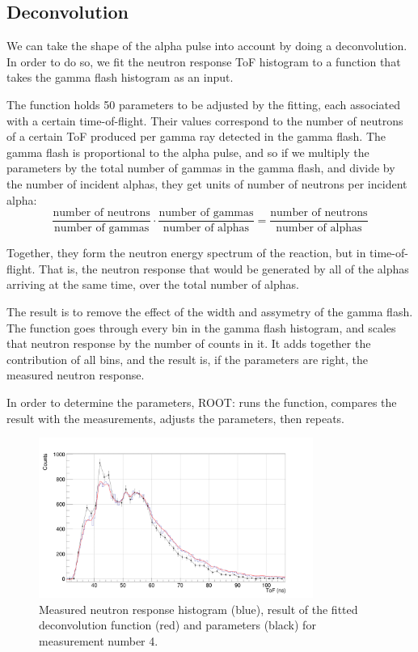 \documentclass[a4paper,12pt]{report}
\begin{document}
\subsection{Deconvolution}
We can take the shape of the alpha pulse into account by doing a deconvolution.
In order to do so, we fit the neutron response ToF histogram to a function that takes the gamma flash histogram as an input.

The function holds 50 parameters to be adjusted by the fitting, each associated with a certain time-of-flight.
Their values correspond to the number of neutrons of a certain ToF produced per gamma ray detected in the gamma flash.
The gamma flash is proportional to the alpha pulse, and so if we multiply the parameters by the total number of gammas in the gamma flash, and divide by the number of incident alphas, they get units of number of neutrons per incident alpha:
\begin{equation}
	\frac{\text{number of neutrons}}{\text{number of gammas}}\cdot \frac{\text{number of gammas}}{\text{number of alphas}} = \frac{\text{number of neutrons}}{\text{number of alphas}}
\end{equation}

Together, they form the neutron energy spectrum of the reaction, but in time-of-flight.
That is, the neutron response that would be generated by all of the alphas arriving at the same time, over the total number of alphas.

The result is to remove the effect of the width and assymetry of the gamma flash.
\\

The function goes through every bin in the gamma flash histogram, and scales that neutron response by the number of counts in it.
It adds together the contribution of all bins, and the result is, if the parameters are right, the measured neutron response.

In order to determine the parameters, ROOT: runs the function, compares the result with the measurements, adjusts the parameters, then repeats.

\begin{figure}[H]
	\centering
	\includegraphics[width=0.80\textwidth]{pulsed_deconvolution_delta.png}
	\caption{Measured neutron response histogram (blue), result of the fitted deconvolution function (red) and parameters (black) for measurement number 4.}
	\label{pulsed_deconvolution_delta}
\end{figure}
\end{document}
